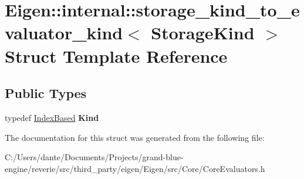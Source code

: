 \hypertarget{struct_eigen_1_1internal_1_1storage__kind__to__evaluator__kind}{}\section{Eigen\+::internal\+::storage\+\_\+kind\+\_\+to\+\_\+evaluator\+\_\+kind$<$ Storage\+Kind $>$ Struct Template Reference}
\label{struct_eigen_1_1internal_1_1storage__kind__to__evaluator__kind}
\subsection*{Public Types}
\begin{DoxyCompactItemize}
\item 
\mbox{\label{struct_eigen_1_1internal_1_1storage__kind__to__evaluator__kind_a2b890b9b3391c22ebdeb3aa778967fe8}} 
typedef \mbox{\hyperlink{struct_eigen_1_1internal_1_1_index_based}{Index\+Based}} {\bfseries Kind}
\end{DoxyCompactItemize}


The documentation for this struct was generated from the following file\+:\begin{DoxyCompactItemize}
\item 
C\+:/\+Users/dante/\+Documents/\+Projects/grand-\/blue-\/engine/reverie/src/third\+\_\+party/eigen/\+Eigen/src/\+Core/Core\+Evaluators.\+h\end{DoxyCompactItemize}
